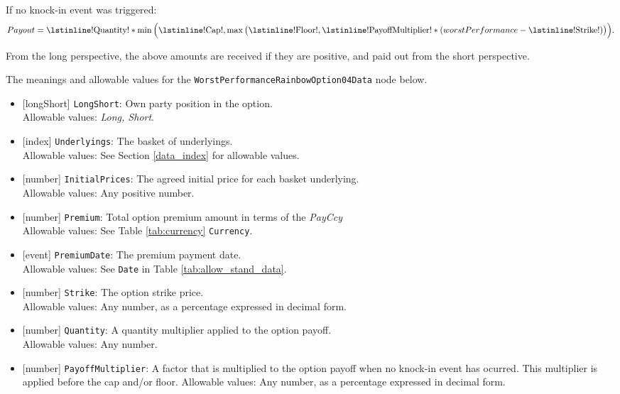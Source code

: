 If no knock-in event was triggered:
\begin{equation*}
  Payout = \text{\lstinline!Quantity!} * \min\Big(\text{\lstinline!Cap!}, \max\big(\text{\lstinline!Floor!}, \text{\lstinline!PayoffMultiplier!} * (worstPerformance - \text{\lstinline!Strike!})\big)\Big).
\end{equation*}

From the long perspective, the above amounts are received if they are positive,
and paid out from the short perspective.

The meanings and allowable values for the \lstinline!WorstPerformanceRainbowOption04Data! node below.

\begin{itemize} 
  \item{}[longShort] \lstinline!LongShort!: Own party position in the option. \\
  Allowable values: \emph{Long, Short}.
  \item{}[index] \lstinline!Underlyings!: The basket of underlyings. \\
  Allowable values: See Section \ref{data_index} for allowable values.
  \item{}[number] \lstinline!InitialPrices!: The agreed initial price for each basket underlying. \\
  Allowable values: Any positive number.
  \item{}[number] \lstinline!Premium!: Total option premium amount in terms of the \emph{PayCcy} \\
  Allowable values: See Table \ref{tab:currency} \lstinline!Currency!.
  \item{}[event] \lstinline!PremiumDate!: The premium payment date. \\
  Allowable values: See \lstinline!Date! in Table \ref{tab:allow_stand_data}.
  \item{}[number] \lstinline!Strike!: The option strike price. \\
  Allowable values: Any number, as a percentage expressed in decimal form.
  \item{}[number] \lstinline!Quantity!: A quantity multiplier applied to the option payoff. \\
  Allowable values: Any number.
  \item{}[number] \lstinline!PayoffMultiplier!: A factor that is multiplied to the option payoff when no knock-in event
  has ocurred. This multiplier is applied before the cap and/or floor.
  Allowable values: Any number, as a percentage expressed in decimal form.

\end{itemize}
